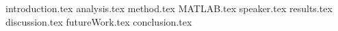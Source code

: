 

{introduction.tex}
{analysis.tex}
{method.tex}
{MATLAB.tex}
{speaker.tex}
{results.tex}
{discussion.tex}
{futureWork.tex}
{conclusion.tex}


%
